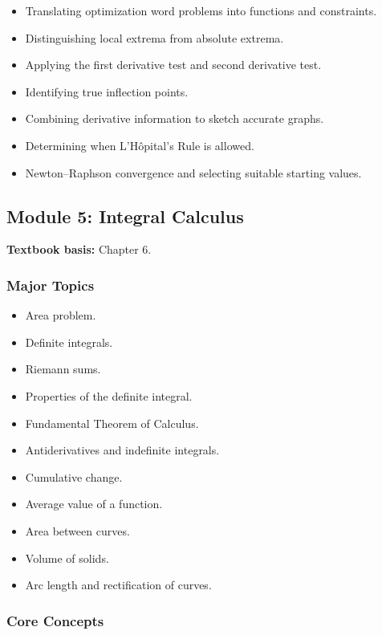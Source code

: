 \documentclass[11pt]{article}
\begin{document}
\begin{itemize}
    \item Translating optimization word problems into functions and constraints.
    \item Distinguishing local extrema from absolute extrema.
    \item Applying the first derivative test and second derivative test.
    \item Identifying true inflection points.
    \item Combining derivative information to sketch accurate graphs.
    \item Determining when L'H\^{o}pital's Rule is allowed.
    \item Newton--Raphson convergence and selecting suitable starting values.
\end{itemize}

\subsection{Module 5: Integral Calculus}

\textbf{Textbook basis:} Chapter 6.

\subsubsection*{Major Topics}

\begin{itemize}
    \item Area problem.
    \item Definite integrals.
    \item Riemann sums.
    \item Properties of the definite integral.
    \item Fundamental Theorem of Calculus.
    \item Antiderivatives and indefinite integrals.
    \item Cumulative change.
    \item Average value of a function.
    \item Area between curves.
    \item Volume of solids.
    \item Arc length and rectification of curves.
\end{itemize}

\subsubsection*{Core Concepts}
\end{document}
